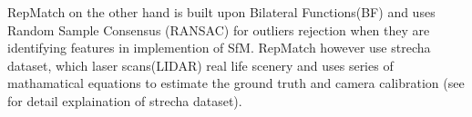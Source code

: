 RepMatch on the other hand is built upon Bilateral Functions(BF)\cite{lin2014bilateral} and uses Random Sample Consensus (RANSAC) \cite{fischler1987random} for outliers rejection when they are identifying features in implemention of SfM. RepMatch however use strecha dataset, which laser scans(LIDAR) real life scenery and uses series of mathamatical equations to estimate the ground truth and camera calibration (see \cite{strecha2008benchmarking} for detail explaination of strecha dataset).